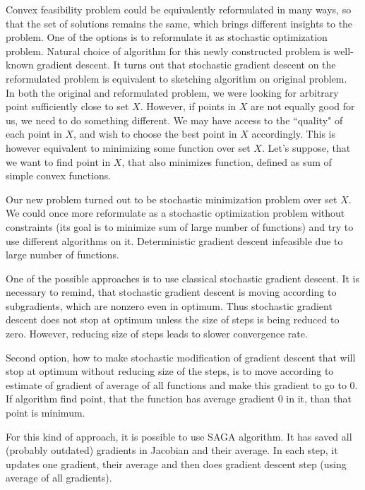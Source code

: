 \documentclass[11pt]{book}
\begin{document}
Convex feasibility problem could be equivalently reformulated in many ways, so that the set of solutions remains the same, which brings different insights to the problem. One of the options is to reformulate it as stochastic optimization problem. Natural choice of algorithm for this newly constructed problem is well-known gradient descent. It turns out that stochastic gradient descent on the reformulated problem is equivalent to sketching algorithm on original problem.\\

In both the original and reformulated problem, we were looking for arbitrary point sufficiently close to set $X$. However, if points in $X$ are not equally good for us, we need to do something different. We may have access to the ``quality" of each point in $X$, and wish to choose the best point in $X$ accordingly. This is however equivalent to minimizing some function over set $X$. Let's suppose, that we want to find point in $X$, that also minimizes function, defined as sum of simple convex functions.

Our new problem turned out to be stochastic minimization problem over set $X$. We could once more reformulate as a stochastic optimization problem without constraints (its goal is to minimize sum of large number of functions) and try to use different algorithms on it. Deterministic gradient descent infeasible due to large number of functions.

One of the possible approaches is to use classical stochastic gradient descent. It is necessary to remind, that stochastic gradient descent is moving according to subgradients, which are nonzero even in optimum. Thus stochastic gradient descent does not stop at optimum unless the size of steps is being reduced to zero. However, reducing size of steps leads to slower convergence rate.

Second option, how to make stochastic modification of gradient descent that will stop at optimum without reducing size of the steps, is to move according to estimate of gradient of average of all functions and make this gradient to go to $0$. If algorithm find point, that the function has average gradient $0$  in it, than that point is minimum. 

For this kind of approach, it is possible to use SAGA algorithm. It has saved all (probably outdated) gradients in Jacobian and their average. In each step, it updates one gradient, their average and then does gradient descent step (using average of all gradients). 
\end{document}
